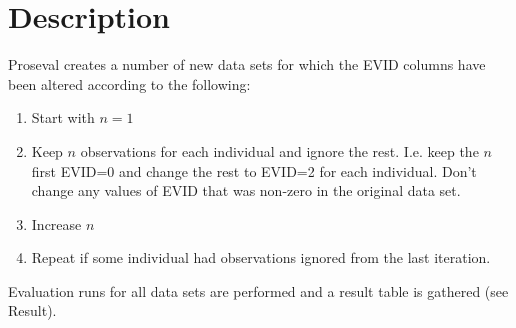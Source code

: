 \section{Description}

Proseval creates a number of new data sets for which the EVID columns have been altered according to the following:

\begin{enumerate}
    \item Start with $n=1$
    \item Keep $n$ observations for each individual and ignore the rest. I.e. keep the $n$ first EVID=0 and change the rest to EVID=2 for each individual. Don't change any values of EVID that was non-zero in the original data set.
    \item Increase $n$
    \item Repeat if some individual had observations ignored from the last iteration.
\end{enumerate}

Evaluation runs for all data sets are performed and a result table is gathered (see Result).



